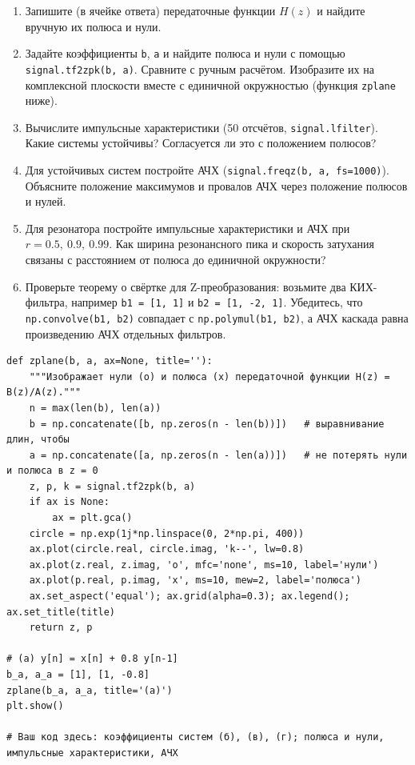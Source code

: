 \documentclass[12pt,a4paper,openany]{book}
\providecommand{\tightlist}{\setlength{\itemsep}{0pt}\setlength{\parskip}{0pt}}
\begin{document}
\begin{enumerate}
\def\labelenumi{\arabic{enumi}.}
\tightlist
\item
  Запишите (в ячейке ответа) передаточные функции \(H(z)\) и найдите вручную их полюса и нули.
\item
  Задайте коэффициенты \texttt{b}, \texttt{a} и найдите полюса и нули с помощью \texttt{signal.\allowbreak{}tf2zpk(\allowbreak{}b,\allowbreak{}\ a)}. Сравните с ручным расчётом. Изобразите их на комплексной плоскости вместе с единичной окружностью (функция \texttt{zplane} ниже).
\item
  Вычислите импульсные характеристики (50 отсчётов, \texttt{signal.\allowbreak{}lfilter}). Какие системы устойчивы? Согласуется ли это с положением полюсов?
\item
  Для устойчивых систем постройте АЧХ (\texttt{signal.\allowbreak{}freqz(\allowbreak{}b,\allowbreak{}\ a,\allowbreak{}\ fs=\allowbreak{}1000)}). Объясните положение максимумов и провалов АЧХ через положение полюсов и нулей.
\item
  Для резонатора постройте импульсные характеристики и АЧХ при \(r = 0.5,\ 0.9,\ 0.99\). Как ширина резонансного пика и скорость затухания связаны с расстоянием от полюса до единичной окружности?
\item
  Проверьте теорему о свёртке для Z-преобразования: возьмите два КИХ-фильтра, например \texttt{b1\ =\allowbreak{}\ {[}1,\allowbreak{}\ 1{]}} и \texttt{b2\ =\allowbreak{}\ {[}1,\allowbreak{}\ -2,\allowbreak{}\ 1{]}}. Убедитесь, что \texttt{np.\allowbreak{}convolve(\allowbreak{}b1,\allowbreak{}\ b2)} совпадает с \texttt{np.\allowbreak{}polymul(\allowbreak{}b1,\allowbreak{}\ b2)}, а АЧХ каскада равна произведению АЧХ отдельных фильтров.
\end{enumerate}

\begin{Verbatim}[fontsize=\small, breaklines, breakanywhere, frame=single, framesep=2mm]
def zplane(b, a, ax=None, title=''):
    """Изображает нули (o) и полюса (x) передаточной функции H(z) = B(z)/A(z)."""
    n = max(len(b), len(a))
    b = np.concatenate([b, np.zeros(n - len(b))])   # выравнивание длин, чтобы
    a = np.concatenate([a, np.zeros(n - len(a))])   # не потерять нули и полюса в z = 0
    z, p, k = signal.tf2zpk(b, a)
    if ax is None:
        ax = plt.gca()
    circle = np.exp(1j*np.linspace(0, 2*np.pi, 400))
    ax.plot(circle.real, circle.imag, 'k--', lw=0.8)
    ax.plot(z.real, z.imag, 'o', mfc='none', ms=10, label='нули')
    ax.plot(p.real, p.imag, 'x', ms=10, mew=2, label='полюса')
    ax.set_aspect('equal'); ax.grid(alpha=0.3); ax.legend(); ax.set_title(title)
    return z, p

# (а) y[n] = x[n] + 0.8 y[n-1]
b_a, a_a = [1], [1, -0.8]
zplane(b_a, a_a, title='(а)')
plt.show()

# Ваш код здесь: коэффициенты систем (б), (в), (г); полюса и нули, импульсные характеристики, АЧХ
\end{Verbatim}
\end{document}
